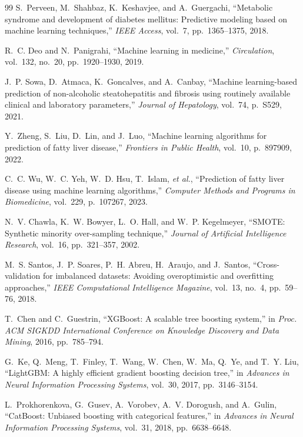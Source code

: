 \documentclass[conference,10pt]{IEEEtran}
\begin{document}
\begin{thebibliography}{99}
S.~Perveen, M.~Shahbaz, K.~Keshavjee, and A.~Guergachi,
``Metabolic syndrome and development of diabetes mellitus: Predictive modeling based on machine learning techniques,''
\textit{IEEE Access}, vol.~7, pp.~1365--1375, 2018.

R.~C. Deo and N.~Panigrahi,
``Machine learning in medicine,''
\textit{Circulation}, vol.~132, no.~20, pp.~1920--1930, 2019.

J.~P. Sowa, D.~Atmaca, K.~Goncalves, and A.~Canbay,
``Machine learning-based prediction of non-alcoholic steatohepatitis and fibrosis using routinely available clinical and laboratory parameters,''
\textit{Journal of Hepatology}, vol.~74, p.~S529, 2021.

Y.~Zheng, S.~Liu, D.~Lin, and J.~Luo,
``Machine learning algorithms for prediction of fatty liver disease,''
\textit{Frontiers in Public Health}, vol.~10, p.~897909, 2022.

C.~C. Wu, W.~C. Yeh, W.~D. Hsu, T.~Islam, \textit{et al.},
``Prediction of fatty liver disease using machine learning algorithms,''
\textit{Computer Methods and Programs in Biomedicine}, vol.~229, p.~107267, 2023.

N.~V. Chawla, K.~W. Bowyer, L.~O. Hall, and W.~P. Kegelmeyer,
``SMOTE: Synthetic minority over-sampling technique,''
\textit{Journal of Artificial Intelligence Research}, vol.~16, pp.~321--357, 2002.

M.~S. Santos, J.~P. Soares, P.~H. Abreu, H.~Araujo, and J.~Santos,
``Cross-validation for imbalanced datasets: Avoiding overoptimistic and overfitting approaches,''
\textit{IEEE Computational Intelligence Magazine}, vol.~13, no.~4, pp.~59--76, 2018.

T.~Chen and C.~Guestrin,
``XGBoost: A scalable tree boosting system,''
in \textit{Proc. ACM SIGKDD International Conference on Knowledge Discovery and Data Mining}, 2016, pp.~785--794.

G.~Ke, Q.~Meng, T.~Finley, T.~Wang, W.~Chen, W.~Ma, Q.~Ye, and T.~Y. Liu,
``LightGBM: A highly efficient gradient boosting decision tree,''
in \textit{Advances in Neural Information Processing Systems}, vol.~30, 2017, pp.~3146--3154.

L.~Prokhorenkova, G.~Gusev, A.~Vorobev, A.~V. Dorogush, and A.~Gulin,
``CatBoost: Unbiased boosting with categorical features,''
in \textit{Advances in Neural Information Processing Systems}, vol.~31, 2018, pp.~6638--6648.


\end{thebibliography}
\end{document}
